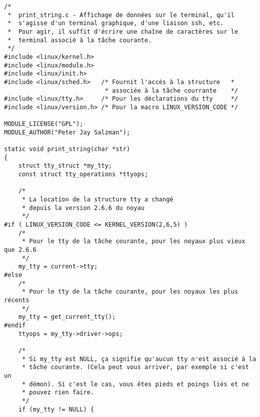 \documentclass[11pt]{article}
\begin{document}
\begin{verbatim}
/*
 *  print_string.c - Affichage de données sur le terminal, qu'il
 *  s'agisse d'un terminal graphique, d'une liaison ssh, etc.
 *  Pour agir, il suffit d'écrire une chaîne de caractères sur le
 *  terminal associé à la tâche courante.
 */
#include <linux/kernel.h>
#include <linux/module.h>
#include <linux/init.h>
#include <linux/sched.h>   /* Fournit l'accès à la structure   *
                            * associée à la tâche courrante    */
#include <linux/tty.h>     /* Pour les déclarations du tty     */
#include <linux/version.h> /* Pour la macro LINUX_VERSION_CODE */

MODULE_LICENSE("GPL");
MODULE_AUTHOR("Peter Jay Salzman");

static void print_string(char *str)
{
    struct tty_struct *my_tty;
    const struct tty_operations *ttyops;

    /*
     * La location de la structure tty a changé
     * depuis la version 2.6.6 du noyau
     */
#if ( LINUX_VERSION_CODE <= KERNEL_VERSION(2,6,5) )
    /*
     * Pour le tty de la tâche courante, pour les noyaux plus vieux que 2.6.6
     */
    my_tty = current->tty;
#else
    /*
     * Pour le tty de la tâche courante, pour les noyaux les plus récents
     */
    my_tty = get_current_tty();
#endif
    ttyops = my_tty->driver->ops;

    /*
     * Si my_tty est NULL, ça signifie qu'aucun tty n'est associé à la
     * tâche courante. (Cela peut vous arriver, par exemple si c'est un
     * démon). Si c'est le cas, vous êtes pieds et poings liés et ne
     * pouvez rien faire.
     */
    if (my_tty != NULL) {


\end{verbatim}
\end{document}
